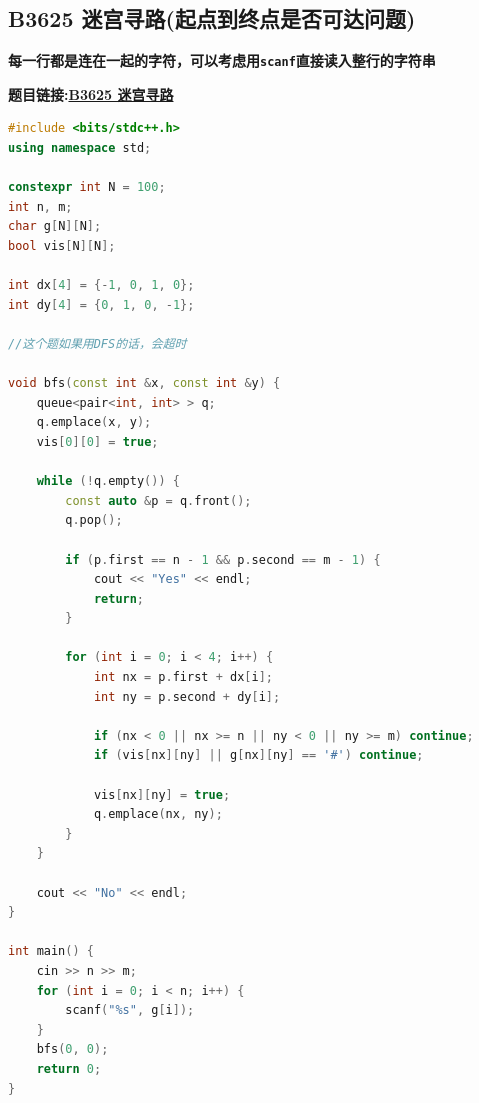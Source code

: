 \newpage

\subsection{B3625 迷宫寻路(起点到终点是否可达问题)}

\textbf{每一行都是连在一起的字符，可以考虑用\texttt{scanf}直接读入整行的字符串}

\textbf{题目链接:\href{https://www.luogu.com.cn/problem/B3625}{B3625 迷宫寻路}}


\begin{lstlisting}[language=c++,caption={BFS解法}]
#include <bits/stdc++.h>
using namespace std;

constexpr int N = 100;
int n, m;
char g[N][N];
bool vis[N][N];

int dx[4] = {-1, 0, 1, 0};
int dy[4] = {0, 1, 0, -1};

//这个题如果用DFS的话，会超时

void bfs(const int &x, const int &y) {
	queue<pair<int, int> > q;
	q.emplace(x, y);
	vis[0][0] = true;
	
	while (!q.empty()) {
		const auto &p = q.front();
		q.pop();
		
		if (p.first == n - 1 && p.second == m - 1) {
			cout << "Yes" << endl;
			return;
		}
		
		for (int i = 0; i < 4; i++) {
			int nx = p.first + dx[i];
			int ny = p.second + dy[i];
			
			if (nx < 0 || nx >= n || ny < 0 || ny >= m) continue;
			if (vis[nx][ny] || g[nx][ny] == '#') continue;
			
			vis[nx][ny] = true;
			q.emplace(nx, ny);
		}
	}
	
	cout << "No" << endl;
}

int main() {
	cin >> n >> m;
	for (int i = 0; i < n; i++) {
		scanf("%s", g[i]);
	}
	bfs(0, 0);
	return 0;
}

\end{lstlisting}
